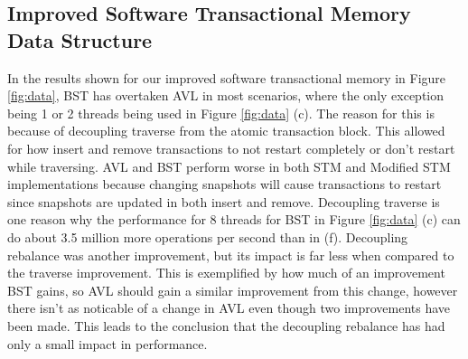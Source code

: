 \documentclass[conference]{IEEEtran}
\theoremstyle{definition}
\theoremstyle{theorem}
\begin{document}
\subsection{Improved Software Transactional Memory Data Structure}
In the results shown for our improved software transactional memory in Figure \ref{fig:data}, BST has overtaken AVL in most scenarios, where the only exception being 1 or 2 threads being used in Figure \ref{fig:data} (c). The reason for this is because of decoupling traverse from the atomic transaction block. This allowed for how insert and remove transactions to not restart completely or don't restart while traversing. AVL and BST perform worse in both STM and Modified STM implementations because changing snapshots will cause transactions to restart since snapshots are updated in both insert and remove. Decoupling traverse is one reason why the performance for 8 threads for BST in Figure \ref{fig:data} (c) can do about 3.5 million more operations per second than in (f). Decoupling rebalance was another improvement, but its impact is far less when compared to the traverse improvement. This is exemplified by how much of an improvement BST gains, so AVL should gain a similar improvement from this change, however there isn't as noticable of a change in AVL even though two improvements have been made. This leads to the conclusion that the decoupling rebalance has had only a small impact in performance.
\end{document}
